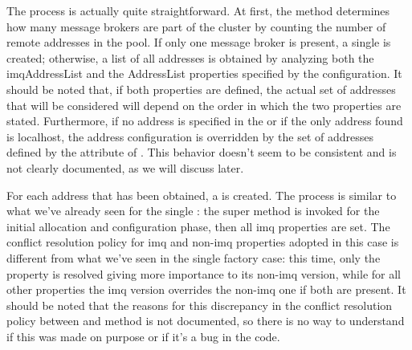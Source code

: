 The process is actually quite straightforward. At first, the method determines how many message brokers are part of the cluster by counting the number of remote addresses in the pool. If only one message broker is present, a single  is created; otherwise, a list of all addresses is obtained by analyzing both the imqAddressList and the AddressList properties specified by the  configuration. It should be noted that, if both properties are defined, the actual set of addresses that will be considered will depend on the order in which the two properties are stated. Furthermore, if no address is specified in the  or if the only address found is localhost, the address configuration is overridden by the set of addresses defined by the  attribute of . This behavior doesn't seem to be consistent and is not clearly documented, as we will discuss later. 

For each address that has been obtained, a  is created. The process is similar to what we've already seen for the single : the super method is invoked for the initial allocation and configuration phase, then all imq properties are set. The conflict resolution policy for imq and non-imq properties adopted in this case is different from what we've seen in the single factory case: this time, only the  property is resolved giving more importance to its non-imq version, while for all other properties the imq version overrides the non-imq one if both are present. It should be noted that the reasons for this discrepancy in the conflict resolution policy between  and  method is not documented, so there is no way to understand if this was made on purpose or if it's a bug in the code.